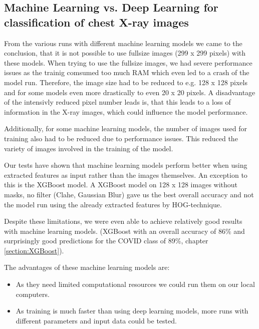 \documentclass{article}
\begin{document}

\subsection{Machine Learning vs. Deep Learning for classification of chest X-ray images}

From the various runs with different machine learning models we came to the conclusion, that it is not possible to use fullsize images (299 x 299 pixels) with these models. 
When trying to use the fullsize images, we had severe performance issues as the trainig comsumed too much RAM which even led to a crash of the model run. Therefore, the image size had to be reduced to e.g. 128 x 128 pixels and for some models even more drastically to even 20 x 20 pixels. A disadvantage of the intensivly reduced pixel number leads is, that this leads to a loss of information in the X-ray images, which could influence the model performance. 

Additionally, for some machine learning models, the number of images used for training also had to be reduced due to performance issues. This reduced the variety of images involved in the training of the model. 

Our tests have shown that machine learning models perform better when using extracted features as input rather than the images themselves. An exception to this is the XGBoost model. A XGBoost model on 128 x 128 images without masks, no filter (Clahe, Gaussian Blur) gave us the best overall accuracy and not the model run using the already extracted features by HOG-technique. 

Despite these limitations, we were even able to achieve relatively good results with machine learning models. (XGBoost with an overall accuracy of 86\% and surprisingly good predictions for the COVID class of 89\%, chapter \ref{section:XGBoost}). 

The advantages of these machine learning models are: 
\begin{itemize}
    \item As they need limited computational resources we could run them on our local computers.
    \item As training is much faster than using deep learning models, more runs with different parameters and input data could be tested. 
\end{itemize}
\end{document}
